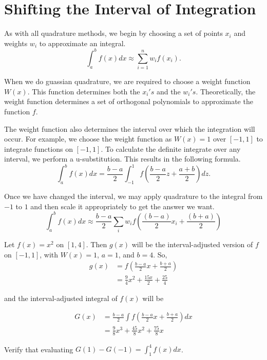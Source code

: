 \label{Lab:GaussQuad}


\section*{Shifting the Interval of Integration}

As with all quadrature methods, we begin by choosing a set of points $x_i$ and weights $w_i$ to approximate an integral.
\[
\int_{a}^b f(x) dx \approx \sum_{i=1}^n w_if(x_i).
\]

When we do guassian quadrature, we are required to choose a weight function $W(x)$.
This function determines both the $x_i's$ and the $w_i's$.
Theoretically, the weight function determines a set of orthogonal polynomials to approximate the function $f$.

The weight function also determines the interval over which the integration will occur.
For example, we choose the weight function as $W(x) = 1$ over $[-1,1]$ to integrate functions on $[-1,1]$.
To calculate the definite integrate over any interval, we perform a u-substitution.
This results in the following formula.
\[
\int_a^b f(x) dx = \frac{b-a}{2}\int_{-1}^1 f(\frac{b-a}{2}z + \frac{a+b}{2})dz.
\]

Once we have changed the interval, we may apply quadrature to the integral from $-1$ to $1$ and then scale it appropriately to get the answer we want.
\[
\int_a^b f(x) dx \approx \frac{b - a}{2} \sum_i w_if(\frac{(b-a)}{2}x_i + \frac{(b+a)}{2})
\]

\begin{problem}
Let $f(x) = x^2$ on $[1,4]$. Then $g(x)$ will be the interval-adjusted version of $f$ on $[-1,1]$, with $W(x)=1$, $a=1$, and $b=4$. So,
\begin{align*}
g(x) &= f(\frac{b-a}{2}x + \frac{b+a}{2}) \\
&= \frac{9}{4} x^2 + \frac{15 x}{2} + \frac{25}{4}
\end{align*}

and the interval-adjusted integral of $f(x)$ will be

\begin{align*}
G(x) &= \frac{b - a}{2} \int f(\frac{b - a}{2} x + \frac{b + a}{2})dx \\
&= \frac{9}{8} x^3 + \frac{45}{8} x^2 + \frac{75}{8} x
\end{align*}

Verify that evaluating $G(1) - G(-1) = \int_1^4 f(x)dx$.
\end{problem}

